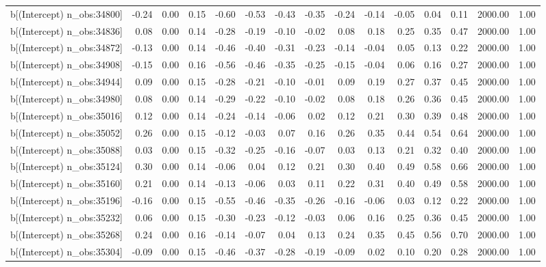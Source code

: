 \begin{table}[ht]
\begin{tabular}{rrrrrrrrrrrrrrr}
  b[(Intercept) n\_obs:34800] & -0.24 & 0.00 & 0.15 & -0.60 & -0.53 & -0.43 & -0.35 & -0.24 & -0.14 & -0.05 & 0.04 & 0.11 & 2000.00 & 1.00 \\ 
  b[(Intercept) n\_obs:34836] & 0.08 & 0.00 & 0.14 & -0.28 & -0.19 & -0.10 & -0.02 & 0.08 & 0.18 & 0.25 & 0.35 & 0.47 & 2000.00 & 1.00 \\ 
  b[(Intercept) n\_obs:34872] & -0.13 & 0.00 & 0.14 & -0.46 & -0.40 & -0.31 & -0.23 & -0.14 & -0.04 & 0.05 & 0.13 & 0.22 & 2000.00 & 1.00 \\ 
  b[(Intercept) n\_obs:34908] & -0.15 & 0.00 & 0.16 & -0.56 & -0.46 & -0.35 & -0.25 & -0.15 & -0.04 & 0.06 & 0.16 & 0.27 & 2000.00 & 1.00 \\ 
  b[(Intercept) n\_obs:34944] & 0.09 & 0.00 & 0.15 & -0.28 & -0.21 & -0.10 & -0.01 & 0.09 & 0.19 & 0.27 & 0.37 & 0.45 & 2000.00 & 1.00 \\ 
  b[(Intercept) n\_obs:34980] & 0.08 & 0.00 & 0.14 & -0.29 & -0.22 & -0.10 & -0.02 & 0.08 & 0.18 & 0.26 & 0.36 & 0.45 & 2000.00 & 1.00 \\ 
  b[(Intercept) n\_obs:35016] & 0.12 & 0.00 & 0.14 & -0.24 & -0.14 & -0.06 & 0.02 & 0.12 & 0.21 & 0.30 & 0.39 & 0.48 & 2000.00 & 1.00 \\ 
  b[(Intercept) n\_obs:35052] & 0.26 & 0.00 & 0.15 & -0.12 & -0.03 & 0.07 & 0.16 & 0.26 & 0.35 & 0.44 & 0.54 & 0.64 & 2000.00 & 1.00 \\ 
  b[(Intercept) n\_obs:35088] & 0.03 & 0.00 & 0.15 & -0.32 & -0.25 & -0.16 & -0.07 & 0.03 & 0.13 & 0.21 & 0.32 & 0.40 & 2000.00 & 1.00 \\ 
  b[(Intercept) n\_obs:35124] & 0.30 & 0.00 & 0.14 & -0.06 & 0.04 & 0.12 & 0.21 & 0.30 & 0.40 & 0.49 & 0.58 & 0.66 & 2000.00 & 1.00 \\ 
  b[(Intercept) n\_obs:35160] & 0.21 & 0.00 & 0.14 & -0.13 & -0.06 & 0.03 & 0.11 & 0.22 & 0.31 & 0.40 & 0.49 & 0.58 & 2000.00 & 1.00 \\ 
  b[(Intercept) n\_obs:35196] & -0.16 & 0.00 & 0.15 & -0.55 & -0.46 & -0.35 & -0.26 & -0.16 & -0.06 & 0.03 & 0.12 & 0.22 & 2000.00 & 1.00 \\ 
  b[(Intercept) n\_obs:35232] & 0.06 & 0.00 & 0.15 & -0.30 & -0.23 & -0.12 & -0.03 & 0.06 & 0.16 & 0.25 & 0.36 & 0.45 & 2000.00 & 1.00 \\ 
  b[(Intercept) n\_obs:35268] & 0.24 & 0.00 & 0.16 & -0.14 & -0.07 & 0.04 & 0.13 & 0.24 & 0.35 & 0.45 & 0.56 & 0.70 & 2000.00 & 1.00 \\ 
  b[(Intercept) n\_obs:35304] & -0.09 & 0.00 & 0.15 & -0.46 & -0.37 & -0.28 & -0.19 & -0.09 & 0.02 & 0.10 & 0.20 & 0.28 & 2000.00 & 1.00 \\ 

\end{tabular}
\end{table}
